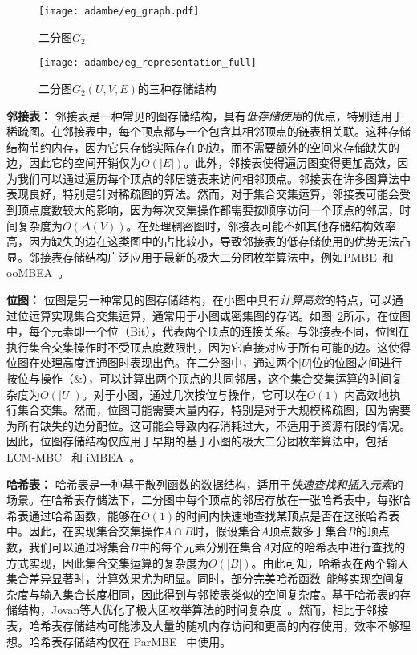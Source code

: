 \begin{figure} [H]
  \centering
  \texttt{[image: adambe/eg\_graph.pdf]}
  \caption{二分图$G_2$}
  \label{fig:ada_eg_tree}
\end{figure}


\begin{figure} [H]
	\centering
  \vspace{0.1in}
	\texttt{[image: adambe/eg\_representation\_full]}
  \vspace{0.2in}
	\caption{二分图$G_2(U,V,E)$的三种存储结构}

	\label{fig:ada_graph_format}
\end{figure}

\textbf{邻接表：} 邻接表是一种常见的图存储结构，具有\emph{低存储使用}的优点，特别适用于稀疏图。在邻接表中，每个顶点都与一个包含其相邻顶点的链表相关联。这种存储结构节约内存，因为它只存储实际存在的边，而不需要额外的空间来存储缺失的边，因此它的空间开销仅为$O(|E|)$。此外，邻接表使得遍历图变得更加高效，因为我们可以通过遍历每个顶点的邻居链表来访问相邻顶点。邻接表在许多图算法中表现良好，特别是针对稀疏图的算法。然而，对于集合交集运算，邻接表可能会受到顶点度数较大的影响，因为每次交集操作都需要按顺序访问一个顶点的邻居，时间复杂度为$O(\Delta(V))$。在处理稠密图时，邻接表可能不如其他存储结构效率高，因为缺失的边在这类图中的占比较小，导致邻接表的低存储使用的优势无法凸显。邻接表存储结构广泛应用于最新的极大二分团枚举算法中，例如PMBE~\cite{PMBE20}和ooMBEA~\cite{ooMBE22}。

\textbf{位图：} 位图是另一种常见的图存储结构，在小图中具有\emph{计算高效}的特点，可以通过位运算实现集合交集运算，通常用于小图或密集图的存储。如图~\ref{fig:ada_graph_format}所示，在位图中，每个元素即一个位（Bit），代表两个顶点的连接关系。与邻接表不同，位图在执行集合交集操作时不受顶点度数限制，因为它直接对应于所有可能的边。这使得位图在处理高度连通图时表现出色。在二分图中，通过两个$|U|$位的位图之间进行按位与操作（\&），可以计算出两个顶点的共同邻居，这个集合交集运算的时间复杂度为$O(|U|)$。对于小图，通过几次按位与操作，它可以在$O(1)$ 内高效地执行集合交集。然而，位图可能需要大量内存，特别是对于大规模稀疏图，因为需要为所有缺失的边分配位。这可能会导致内存消耗过大，不适用于资源有限的情况。因此，位图存储结构仅应用于早期的基于小图的极大二分团枚举算法中，包括 LCM-MBC~\cite{lcmmbc07} 和 iMBEA~\cite{iMBEA14}。

\textbf{哈希表：} 哈希表是一种基于散列函数的数据结构，适用于\emph{快速查找和插入元素}的场景。在哈希表存储法下，二分图中每个顶点的邻居存放在一张哈希表中，每张哈希表通过哈希函数，能够在$O(1)$的时间内快速地查找某顶点是否在这张哈希表中。因此，在实现集合交集操作$A \cap B$时，假设集合$A$顶点数多于集合$B$的顶点数，我们可以通过将集合$B$中的每个元素分别在集合$A$对应的哈希表中进行查找的方式实现，因此集合交集运算的复杂度为$O(|B|)$。由此可知，哈希表在两个输入集合差异显著时，计算效果尤为明显。同时，部分完美哈希函数~\cite{cuckoohash04,murmurhash}能够实现空间复杂度与输入集合长度相同，因此得到与邻接表类似的空间复杂度。基于哈希表的存储结构，Jovan等人优化了极大团枚举算法的时间复杂度~\cite{MCE20}。然而，相比于邻接表，哈希表存储结构可能涉及大量的随机内存访问和更高的内存使用，效率不够理想。哈希表存储结构仅在 ParMBE~\cite{parMBE19} 中使用。


